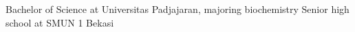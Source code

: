 %
%
%


\begin{scholarship}
					{Bachelor of Science at Universitas Padjajaran, majoring biochemistry}
					{Senior high school at SMUN 1 Bekasi}
\end{scholarship}